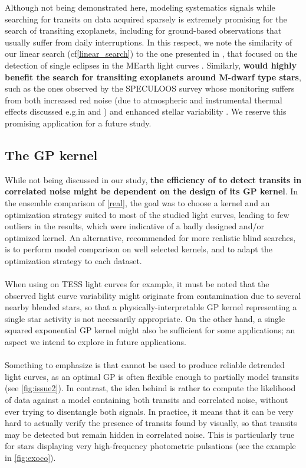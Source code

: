 \documentclass[modern]{aastex631}
\begin{document}
Although not being demonstrated here, modeling systematics signals while searching for transits on data acquired sparsely is extremely promising for the search of transiting exoplanets, including for ground-based observations that usually suffer from daily interruptions. In this respect, we note the similarity of our linear search (cf\;\autoref{linear_search}) to the one presented in \citealt{Berta2012}, that focused on the detection of single eclipses in the MEarth light curves \citep{Irwin2009}. Similarly, \textbf{\nuancemethod{} would highly benefit the search for transiting exoplanets around M-dwarf type stars}, such as the ones observed by the SPECULOOS survey \citep{speculoos} whose monitoring suffers from both increased red noise (due to atmospheric and instrumental thermal effects discussed e.g.\;in \citealt{Berta2012} and  \citealt{Pedersen2023}) and enhanced stellar variability \citep{Murray2020}. We reserve this promising application for a future study.

\subsection{The GP kernel}
While not being discussed in our study, \textbf{the efficiency of \nuancemethod{} to detect transits in correlated noise might be dependent on the design of its GP kernel}. In the ensemble comparison of \autoref{real}, the goal was to choose a kernel and an optimization strategy suited to most of the studied light curves, leading to few outliers in the results, which were indicative of a badly designed and/or optimized kernel. An alternative, recommended for more realistic blind searches, is to perform model comparison on well selected kernels, and to adapt the optimization strategy to each dataset.\\\\
When using \nuancecode{} on TESS light curves for example, it must be noted that the observed light curve variability might originate from contamination due to several nearby blended stars, so that a physically-interpretable GP kernel representing a single star activity is not necessarily appropriate. On the other hand, a single squared exponential GP kernel might also be sufficient for some applications; an aspect we intend to explore in future applications.\\\\
Something to emphasize is that \nuancemethod{} cannot be used to produce reliable detrended light curves, as an optimal GP is often flexible enough to partially model transits (see \autoref{fig:issue2}). 
In contrast, the idea behind \nuancemethod{} is rather to compute the likelihood of data against a model containing both transits and correlated noise, without ever trying to disentangle both signals. In practice, it means that it can be very hard to actually verify the presence of transits found by \nuancemethod{} visually, so that transits may be detected but remain hidden in correlated noise. This is particularly true for stars displaying very high-frequency photometric pulsations (see the example in \autoref{fig:exoco}).
\end{document}
